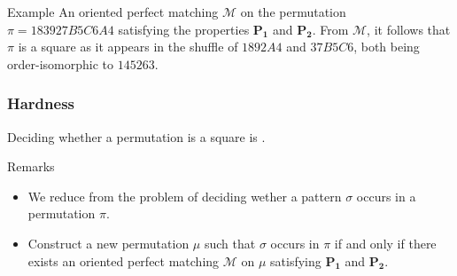 \documentclass[unknownkeysallowed,10pt,xcolor={dvipsnames}]{beamer}
\begin{document}
\begin{frame}
\begin{exampleblock}{Example}
    {\small%
    An oriented perfect matching $\mathcal{M}$ on the permutation
    $\pi = 183927B5C6A4$ satisfying the properties $\mathbf{P_1}$
    and $\mathbf{P_2}$. From $\mathcal{M}$, it follows that $\pi$ is
    a square as it appears in the shuffle of $1892A4$ and $37B5C6$,
    both being order-isomorphic to $145263$.
    }%
  \end{exampleblock}
\end{frame}


\begin{frame}
  \frametitle{Hardness}

  \begin{theorem}
    Deciding whether a permutation is a square is \NPC.
  \end{theorem}

  \medskip

  \begin{block}{Remarks}
    \begin{itemize}
      \item
      We reduce from the problem of deciding wether a pattern $\sigma$ occurs in a
      permutation $\pi$.

      \smallskip

      \item
      Construct a new permutation $\mu$ such that
      $\sigma$ occurs in $\pi$ if and only if
      there exists an oriented perfect matching $\mathcal{M}$ on $\mu$
      satisfying $\mathbf{P_1}$ and $\mathbf{P_2}$.
    \end{itemize}
  \end{block}
\end{frame}

\end{document}
